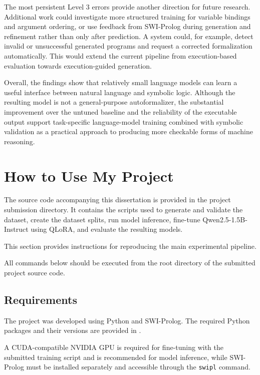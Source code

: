 \documentclass[11pt]{article} %
\theoremstyle{plain}
\theoremstyle{definition}
\begin{document}
The most persistent Level 3 errors provide another direction for future
research. Additional work could investigate more structured training for
variable bindings and argument ordering, or use feedback from SWI-Prolog
during generation and refinement rather than only after prediction. A system
could, for example, detect invalid or unsuccessful generated programs and
request a corrected formalization automatically. This would extend the current
pipeline from execution-based evaluation towards execution-guided generation.

Overall, the findings show that relatively small language models can learn a
useful interface between natural language and symbolic logic. Although the
resulting model is not a general-purpose autoformalizer, the substantial
improvement over the untuned baseline and the reliability of the executable
output support task-specific language-model training combined with symbolic
validation as a practical approach to producing more checkable forms of
machine reasoning.


\clearpage
\section{How to Use My Project}
\label{sec:code-usage}

The source code accompanying this dissertation is provided in the project
submission directory. It contains the scripts used to generate and validate
the dataset, create the dataset splits, run model inference, fine-tune
Qwen2.5-1.5B-Instruct using QLoRA, and evaluate the resulting models.

This section provides instructions for reproducing the main experimental
pipeline.

All commands below should be executed from the root directory of the submitted
project source code.


\subsection{Requirements}

The project was developed using Python and SWI-Prolog. The required Python
packages and their versions are provided in .

A CUDA-compatible NVIDIA GPU is required for fine-tuning with the submitted
training script and is recommended for model inference, while SWI-Prolog must
be installed separately and accessible through the \texttt{swipl} command.
\end{document}
